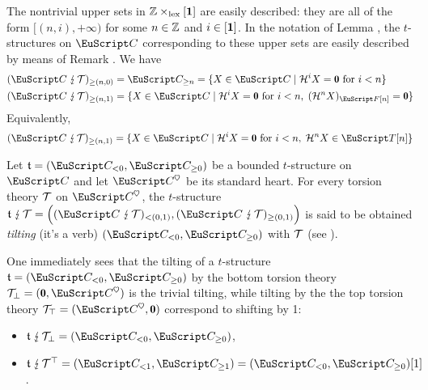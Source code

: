 \begin{remark}\label{rem.explicit.tilt}
The nontrivial upper sets in $\mathbb{Z} \times_{\mathrm{lex}} [\mathbf{1}]$ are easily described: they are all of the form $[(n,i),+\infty)$ for some $n\in \mathbb{Z}$ and $i\in [\mathbf{1}]$. In the notation of Lemma , the $t$-structures on $\C$ corresponding to these upper sets are easily described by means of Remark . We have
\begin{align*}
(\C\tilted\T)_{\geq (n,0)} &=\C_{\geq n}=\{X \in \C \mid \mathcal{H}^iX=\zero \text{ for } i<n\}\\
(\C\tilted\T)_{\geq (n,1)} &=\{X \in \C \mid \mathcal{H}^iX=\zero \text{ for } i<n, \; (\mathcal{H}^nX)_{\cate{F}[n]}=\zero\}
\end{align*}
Equivalently,
\[
(\C\tilted\T)_{\geq (n,1)}=\{X \in \C \mid \mathcal{H}^iX=\zero \text{ for } i<n,\; \mathcal{H}^nX\in \cate{T}[n]\}
\] 
\end{remark}

\begin{definition}\label{def.tilting}
Let $\tee=(\C_{<0},\C_{\ge 0})$ be a bounded $t$-structure on $\C$ and let $\C^\heart$ be its standard heart. For every torsion theory $\mathcal{T}$ on $\C^\heart$, the $t$-structure $\tee\tilted\T  = \Big((\C\tilted\T)_{< (0,1)} , (\C\tilted\T)_{\ge (0,1)}\Big)$ is said to be obtained \emph{tilting} (it's a verb) $(\C_{ < 0},\C_{\ge 0})$ with $\mathcal{T}$ (see \cite{Beligiannisreiten}).
\end{definition}

\begin{remark}\label{trivial.tilting}
One immediately sees that the tilting of a $t$-structure $\tee=(\C_{< 0},\C_{ \ge 0})$ by the bottom torsion theory $\T_\perp = (\zero,\C^\heart)$ is the trivial tilting, while tilting by the the top torsion theory $\T_\top = (\C^\heart,\zero)$
correspond to shifting by 1:
\begin{itemize}
 	\item $\tee\tilted\T_\perp = %
 	(\C_{< 0},\C_{\ge 0})$,
 	\item $\tee\tilted\T^\top  = %
 	(\C_{< 1},\C_{\ge 1})=(\C_{< 0},\C_{\ge 0})[1]$.
 \end{itemize} 
\end{remark}

